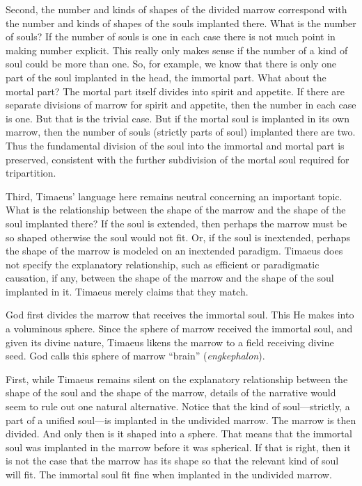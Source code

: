 Second, the number and kinds of shapes of the divided marrow correspond with the number and kinds of shapes of the souls implanted there. What is the number of souls? If the number of souls is one in each case there is not much point in making number explicit. This really only makes sense if the number of a kind of soul could be more than one. So, for example, we know that there is only one part of the soul implanted in the head, the immortal part. What about the mortal part? The mortal part itself divides into spirit and appetite. If there are separate divisions of marrow for spirit and appetite, then the number in each case is one. But that is the trivial case. But if the mortal soul is implanted in its own marrow, then the number of souls (strictly parts of soul) implanted there are two. Thus the fundamental division of the soul into the immortal and mortal part is preserved, consistent with the further subdivision of the mortal soul required for tripartition.

Third, Timaeus' language here remains neutral concerning an important topic. What is the relationship between the shape of the marrow and the shape of the soul implanted there? If the soul is extended, then perhaps the marrow must be so shaped otherwise the soul would not fit. Or, if the soul is inextended, perhaps the shape of the marrow is modeled on an inextended paradigm. Timaeus does not specify the explanatory relationship, such as efficient or paradigmatic causation, if any, between the shape of the marrow and the shape of the soul implanted in it. Timaeus merely claims that they match.

God first divides the marrow that receives the immortal soul. This He makes into a voluminous sphere. Since the sphere of marrow received the immortal soul, and given its divine nature, Timaeus likens the marrow to a field receiving divine seed. God calls this sphere of marrow ``brain'' (\emph{engkephalon}).

First, while Timaeus remains silent on the explanatory relationship between the shape of the soul and the shape of the marrow, details of the narrative would seem to rule out one natural alternative. Notice that the kind of soul---strictly, a part of a unified soul---is implanted in the undivided marrow. The marrow is then divided. And only then is it shaped into a sphere. That means that the immortal soul was implanted in the marrow before it was spherical. If that is right, then it is not the case that the marrow has its shape so that the relevant kind of soul will fit. The immortal soul fit fine when implanted in the undivided marrow.

